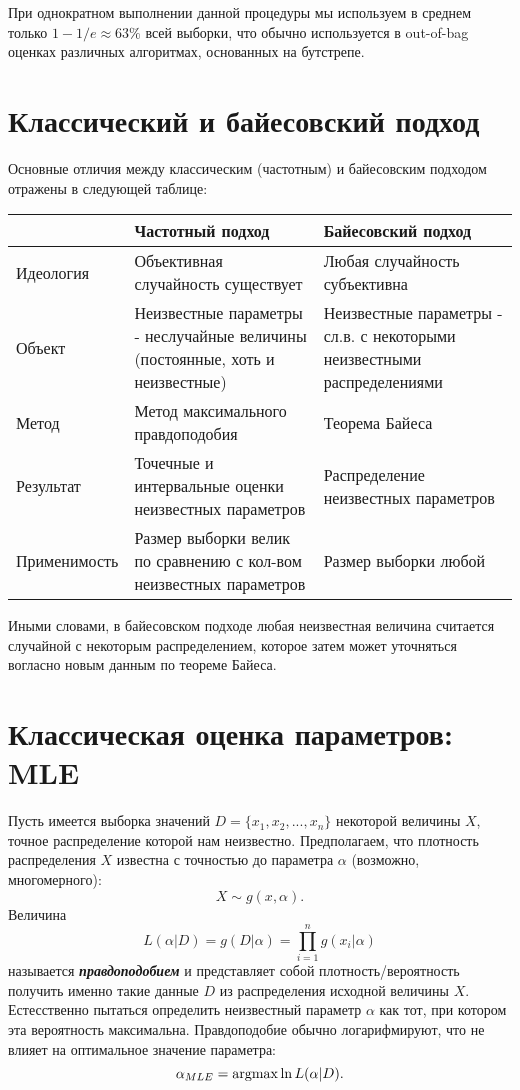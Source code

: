 При однократном выполнении данной процедуры мы используем в среднем только $1 - 1/e \approx 63\%$ всей выборки, что обычно используется в out-of-bag оценках различных алгоритмах, основанных на бутстрепе.


\section{Классический и байесовский подход}

Основные отличия между классическим (частотным) и байесовским подходом отражены в следующей таблице:

\begin{tabular}{ p{3cm}|p{6cm}|p{5cm} }
          & Частотный подход & Байесовский подход \\ \hline 
Идеология & Объективная случайность существует & Любая случайность субъективна \\
Объект    & Неизвестные параметры - неслучайные величины (постоянные, хоть и неизвестные) & Неизвестные параметры -  сл.в. с некоторыми неизвестными распределениями \\
Метод     & Метод максимального правдоподобия & Теорема Байеса \\
Результат & Точечные и интервальные оценки неизвестных параметров & Распределение неизвестных параметров \\
Применимость & Размер выборки велик по сравнению с кол-вом неизвестных параметров & Размер выборки любой \\ \hline
\end{tabular}

Иными словами, в байесовском подходе любая неизвестная величина считается случайной с некоторым распределением, которое затем может уточняться вогласно новым данным по теореме Байеса. 

\section{Классическая оценка параметров: MLE}

Пусть имеется выборка значений $D = \{x_1, x_2, ..., x_n\}$ некоторой величины $X$, точное распределение которой нам неизвестно. Предполагаем, что плотность распределения $X$ известна с точностью до параметра $\alpha$ (возможно, многомерного): 
$$
X \sim g(x, \alpha).
$$
Величина
$$
L(\alpha|D) = g(D | \alpha) = \prod_{i=1}^n g(x_i | \alpha)
$$
называется \textbf{\textit{правдоподобием}} и представляет собой плотность/вероятность получить именно такие данные $D$ из распределения исходной величины $X$. Естесственно пытаться определить неизвестный параметр $\alpha$ как тот, при котором эта вероятность максимальна. Правдоподобие обычно логарифмируют, что не влияет на оптимальное значение параметра:
$$
\alpha_{MLE} = \operatorname*{argmax}{\ln{L(\alpha|D)}}.
$$


